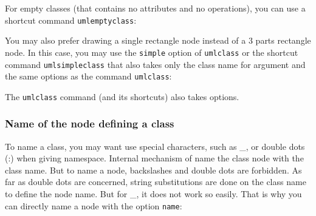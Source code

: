 \documentclass[a4paper,11pt]{report}
\begin{document}
\medskip

For empty classes (that contains no attributes and no operations), you can use a shortcut command {\tt umlemptyclass}:

\begin{minipage}{0.5\textwidth}
	
\end{minipage}
\begin{minipage}{0.4\textwidth}
	\begin{center}
	\end{center}
\end{minipage}

\medskip

You may also prefer drawing a single rectangle node instead of a 3 parts rectangle node. In this case, you may use the {\tt simple} option of {\tt umlclass} or the shortcut command {\tt umlsimpleclass} that also takes only the class name for argument and the same options as the command {\tt umlclass}:

\medskip

\begin{minipage}{0.5\textwidth}
	
\end{minipage}
\begin{minipage}{0.4\textwidth}
	\begin{center}
	\end{center}
\end{minipage}

\medskip

The {\tt umlclass} command (and its shortcuts) also takes options.

\subsubsection{Name of the node defining a class}\label{ss.classnodename}

To name a class, you may want use special characters, such as \_{}, or double dots (:) when giving namespace. Internal mechanism of \tuml name the class node with the class name. But to name a \TikZ node, backslashes and double dots are forbidden. As far as double dots are concerned, string substitutions are done on the class name to define the node name. But for \_{}, it does not work so easily. That is why you can directly name a node with the option {\tt name}:

\medskip

\begin{minipage}{0.5\textwidth}
	
\end{minipage}
\begin{minipage}{0.4\textwidth}
	\begin{center}
	\end{center}
\end{minipage}
\end{document}
